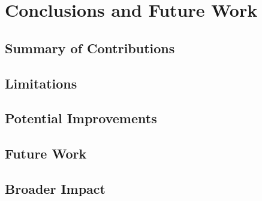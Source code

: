 \chapter[Chapter 5]{Conclusions and Future Work}
\label{chap:conclusions_future_work}

\section{Summary of Contributions}
\label{sec:summary_contributions}

\section{Limitations}
\label{sec:limitations_conclusions}

\section{Potential Improvements}
\label{sec:potential_improvements}

\section{Future Work}
\label{sec:future_work}

\section{Broader Impact}
\label{sec:broader_impact}

